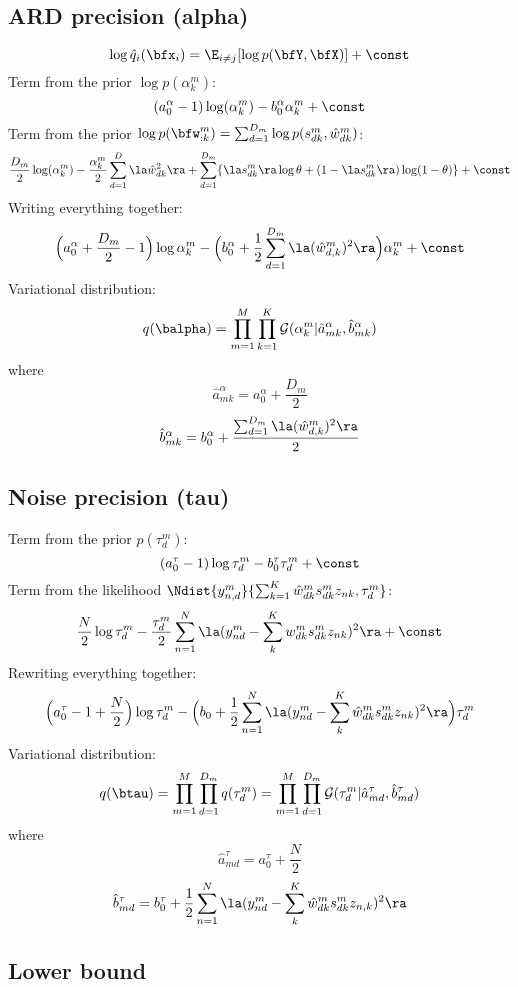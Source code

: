 \documentclass[10pt, a4paper,openany]{report}
\begin{document}
\subsection*{ARD precision (alpha)}
\begin{equation} \label{eq:optimal_q_dist}
\log \hat{q}_i(\bfx_i) = \E_{i \neq j} [\log p(\bfY,\bfX)] + \const
\end{equation}
Term from the prior $\log p(\alpha_k^m)$:
\[
(a_0^\alpha-1) \log(\alpha_k^m) - b_0^{\alpha}\alpha_k^m + \const
\]
Term from the prior $\log p(\bfw_{:k}^m) = \sum_{d=1}^{D_m} \log p(s_{dk}^m,\hat{w}_{dk}^m)$:
\[
\frac{D_m}{2}\log(\alpha_k^m) -\frac{\alpha_k^m}{2}\sum_{d=1}^{D} \la \hat{w}_{dk}^2 \ra + \sum_{d=1}^{D_m} \{ \la s_{dk}^m \ra \log\theta + (1-\la s_{dk}^m \ra)\log(1-\theta) \} + \const
\]
Writing everything together:
\[
\Big(a_0^{\alpha} + \frac{D_m}{2} - 1 \Big)\log\alpha_k^m - \Big(b_0^{\alpha} + \frac{1}{2} \sum_{d=1}^{D_m}\la (\hat{w}_{d,k}^m)^2 \ra \Big) \alpha_k^m + \const
\]
Variational distribution:
\[
q(\balpha) = \prod_{m=1}^{M} \prod_{k=1}^{K} \mathcal{G}(\alpha_k^m | \hat{a}_{mk}^{\alpha}, \hat{b}_{mk}^{\alpha})
\]
where
\[
\hat{a}_{mk}^\alpha = a_0^\alpha + \frac{D_m}{2}
\]
\[
\hat{b}_{mk}^\alpha = b_0^\alpha +\frac{ \sum_{d=1}^{D_m} \la (\hat{w}_{d,k}^m)^2 \ra }{2}
\]

\subsection*{Noise precision (tau)}
Term from the prior $p(\tau_d^m)$:
\[
(a_0^\tau - 1) \log \tau_d^m - b_0^\tau \tau_d^m + \const
\]
Term from the likelihood $\Ndist{y_{n,d}^m}{\sum_{k=1}^{K}\hat{w}_{dk}^m s_{dk}^m z_{nk},\tau_d^m}$:
\[
\frac{N}{2}\log \tau_d^m - \frac{\tau_d^m}{2} \sum_{n=1}^{N} \la (y_{nd}^m - \sum_k^{K} w_{dk}^m s_{dk}^m z_{nk})^2 \ra + \const
\]
Rewriting everything together:
\[
\Big(a_0^\tau - 1 + \frac{N}{2} \Big)\log \tau_d^m - \Big( b_0 + \frac{1}{2} \sum_{n=1}^{N} \la (y_{nd}^m - \sum_k^{K} \hat{w}_{dk}^m s_{dk}^m z_{nk})^2 \ra  \Big )\tau_d^m
\]
Variational distribution:
\[
q(\btau) = \prod_{m=1}^{M} \prod_{d=1}^{D_m} q(\tau_d^m) = \prod_{m=1}^{M} \prod_{d=1}^{D_m} \mathcal{G}(\tau_d^m|\hat{a}_{md}^{\tau},\hat{b}_{md}^{\tau})
\]
where
\[
\hat{a}_{md}^{\tau} = a_0^{\tau} + \frac{N}{2}
\]
\[
\hat{b}_{md}^{\tau} = b_0^{\tau} + \frac{1}{2} \sum_{n=1}^{N} \la (y_{nd}^m - \sum_k^{K} \hat{w}_{dk}^m s_{dk}^m z_{n,k})^2 \ra
\]

\subsection{Lower bound}
\end{document}
